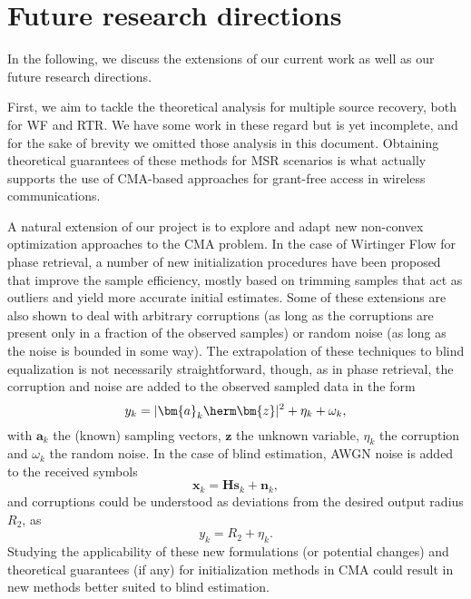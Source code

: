 \chapter{Future research directions}
\label{chap:future}

In the following, we discuss the extensions of our current work as well as our
future research directions. 

First, we aim to tackle the theoretical analysis for multiple source recovery, both for WF and RTR. We have some work in these regard but is yet incomplete, and for the sake of brevity we omitted those analysis in this document. Obtaining theoretical guarantees of these methods for MSR scenarios is what actually supports the use of CMA-based approaches for grant-free access in wireless communications.

A natural extension of our project is to explore and adapt new non-convex optimization approaches to the CMA problem. In the case of Wirtinger Flow for phase retrieval, a number of new initialization procedures have been proposed \cite{Candes2015a_phaseretrievalWF,Chen2015truncatedwf,Zhang2016mediantruncatedwf,Bostan2018AcceleratedWF} that improve the sample efficiency, mostly based on trimming samples that act as outliers and yield more accurate initial estimates. 
Some of these extensions are also shown to deal with arbitrary corruptions \cite{Zhang2016mediantruncatedwf} (as long as the corruptions are present only in a fraction of the observed samples) or random noise \cite{Cai2016thresholdedwf,Lazreg2018optimasparselrobustwf} (as long as the noise is bounded in some way). The extrapolation of these techniques to blind equalization is not necessarily straightforward, though, as in phase retrieval, the corruption and noise are added to the observed sampled data in the form 
\begin{equation}
y_k=|\bm{a}_k\herm\bm{z}|^2 + \eta_k+\omega_k,
\end{equation} 
with $\bm{a}_k$ the (known) sampling vectors, $\bm{z}$ the unknown variable, $\eta_k$ the corruption and $\omega_k$ the random noise. In the case of blind estimation, AWGN noise is added to the received symbols 
\begin{equation}
\bm{x}_k=\bm{H}\bm{s}_k+\bm{n}_k,
\end{equation}
and corruptions could be understood as deviations from the desired output radius $R_2$, as
\begin{equation}
y_k=R_2+\eta_k.
\end{equation} 
Studying the applicability of these new formulations (or potential changes) and theoretical guarantees (if any) for initialization methods in CMA could result in new methods better suited to blind estimation.

